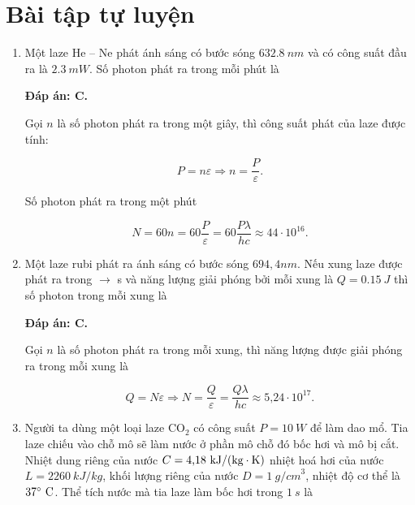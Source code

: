 \section{Bài tập tự luyện}
\begin{enumerate}[label=\bfseries Câu \arabic*:]
	\item {}
	\cauhoi
	{ Một laze He – Ne phát ánh sáng có bước sóng $\SI{632,8}{nm}$ và có công suất đầu ra là $\SI{2,3}{mW}$. Số photon phát ra trong mỗi phút là
		
	}
	
	\loigiai
	{		\textbf{Đáp án: C.}
		
		 Gọi $n$ là số photon phát ra trong một giây, thì công suất phát của laze được tính: 
		 
		 $$P = n\varepsilon \Rightarrow n = \dfrac{P}{\varepsilon}.$$
		 
		 Số photon phát ra trong một phút
		 
		 $$N = 60n = 60\dfrac{P}{\varepsilon} = 60 \dfrac{P\lambda}{hc} \approx 44 \cdot 10^{16}.$$
		
	}
	
	\item {} 
		\cauhoi
	{ Một laze rubi phát ra ánh sáng có bước sóng $694,4 nm$. Nếu xung laze được phát ra trong $\to$ s và năng lượng giải phóng bởi mỗi xung là $Q = \SI{0,15}{J}$ thì số photon trong mỗi xung là
		
	}
	
	\loigiai
	{		\textbf{Đáp án: C.}
		
		Gọi $n$ là số photon phát ra trong mỗi xung, thì năng lượng được giải phóng ra trong mỗi xung là
		
		$$Q = N\varepsilon \Rightarrow N  = \dfrac{Q}{\varepsilon} = \dfrac{Q\lambda}{hc} \approx \text{5,24} \cdot 10^{17}.$$
	}
	\item {} 
	\cauhoi
	{ Người ta dùng một loại laze CO$_2$ có công suất $P=  \SI{10}{W}$ để làm dao mổ. Tia laze chiếu vào chỗ mô sẽ làm nước ở phần mô chỗ đó bốc hơi và mô bị cắt. Nhiệt dung riêng của nước $C = \text{4,18}\ \text{kJ}/(\text{kg}\cdot \text K)$ nhiệt hoá hơi của nước $L = \SI{2260}{kJ/kg}$, khối lượng riêng của nước $D = \SI{1}{g/cm}^3$, nhiệt độ cơ thể là $37^\circ\ \text C$. Thể tích nước mà tia laze làm bốc hơi trong $\SI{1}{s}$ là
		
}
\end{enumerate}
